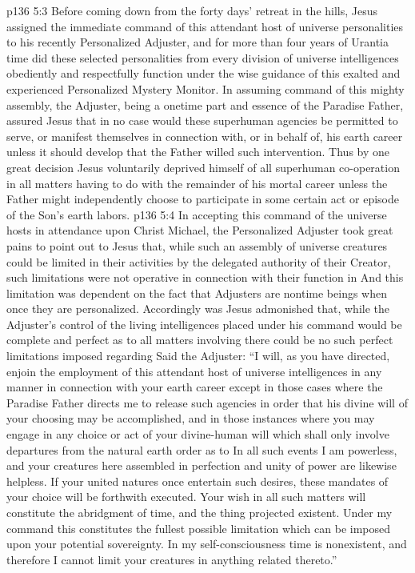 \vs p136 5:3 \pc Before coming down from the forty days’ retreat in the hills, Jesus assigned the immediate command of this attendant host of universe personalities to his recently Personalized Adjuster, and for more than four years of Urantia time did these selected personalities from every division of universe intelligences obediently and respectfully function under the wise guidance of this exalted and experienced Personalized Mystery Monitor. In assuming command of this mighty assembly, the Adjuster, being a onetime part and essence of the Paradise Father, assured Jesus that in no case would these superhuman agencies be permitted to serve, or manifest themselves in connection with, or in behalf of, his earth career unless it should develop that the Father willed such intervention. Thus by one great decision Jesus voluntarily deprived himself of all superhuman co\hyp{}operation in all matters having to do with the remainder of his mortal career unless the Father might independently choose to participate in some certain act or episode of the Son’s earth labors.
\vs p136 5:4 In accepting this command of the universe hosts in attendance upon Christ Michael, the Personalized Adjuster took great pains to point out to Jesus that, while such an assembly of universe creatures could be limited in their  activities by the delegated authority of their Creator, such limitations were not operative in connection with their function in  And this limitation was dependent on the fact that Adjusters are nontime beings when once they are personalized. Accordingly was Jesus admonished that, while the Adjuster’s control of the living intelligences placed under his command would be complete and perfect as to all matters involving  there could be no such perfect limitations imposed regarding  Said the Adjuster: “I will, as you have directed, enjoin the employment of this attendant host of universe intelligences in any manner in connection with your earth career except in those cases where the Paradise Father directs me to release such agencies in order that his divine will of your choosing may be accomplished, and in those instances where you may engage in any choice or act of your divine\hyp{}human will which shall only involve departures from the natural earth order as to  In all such events I am powerless, and your creatures here assembled in perfection and unity of power are likewise helpless. If your united natures once entertain such desires, these mandates of your choice will be forthwith executed. Your wish in all such matters will constitute the abridgment of time, and the thing projected  existent. Under my command this constitutes the fullest possible limitation which can be imposed upon your potential sovereignty. In my self\hyp{}consciousness time is nonexistent, and therefore I cannot limit your creatures in anything related thereto.”
